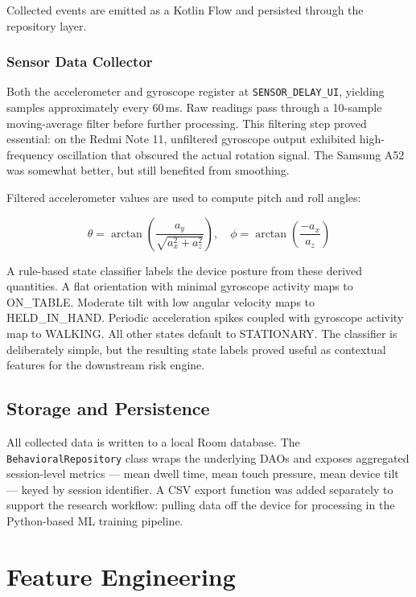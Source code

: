 \documentclass[conference]{IEEEtran}
\begin{document}
Collected events are emitted as a Kotlin Flow and persisted through the repository layer.

\subsubsection{Sensor Data Collector}
Both the accelerometer and gyroscope register at \texttt{SENSOR\_DELAY\_UI}, yielding samples approximately every 60\,ms. Raw readings pass through a 10-sample moving-average filter before further processing. This filtering step proved essential: on the Redmi Note 11, unfiltered gyroscope output exhibited high-frequency oscillation that obscured the actual rotation signal. The Samsung A52 was somewhat better, but still benefited from smoothing.

Filtered accelerometer values are used to compute pitch and roll angles:

\begin{equation}
\theta = \arctan\!\left(\frac{a_y}{\sqrt{a_x^2 + a_z^2}}\right), \quad
\phi = \arctan\!\left(\frac{-a_x}{a_z}\right)
\end{equation}

A rule-based state classifier labels the device posture from these derived quantities. A flat orientation with minimal gyroscope activity maps to ON\_TABLE. Moderate tilt with low angular velocity maps to HELD\_IN\_HAND. Periodic acceleration spikes coupled with gyroscope activity map to WALKING. All other states default to STATIONARY. The classifier is deliberately simple, but the resulting state labels proved useful as contextual features for the downstream risk engine.

\subsection{Storage and Persistence}

All collected data is written to a local Room database. The \texttt{BehavioralRepository} class wraps the underlying DAOs and exposes aggregated session-level metrics --- mean dwell time, mean touch pressure, mean device tilt --- keyed by session identifier. A CSV export function was added separately to support the research workflow: pulling data off the device for processing in the Python-based ML training pipeline.


\section{Feature Engineering}
\label{sec:features}
\end{document}

